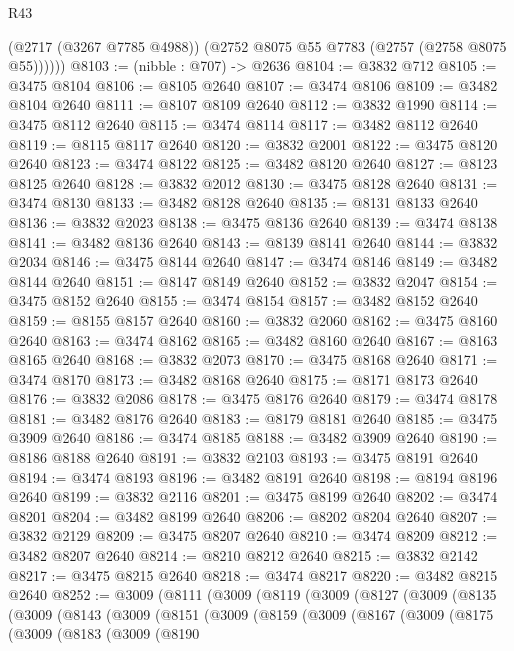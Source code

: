 \begin{lexlean}{R43}
\begin{coremodule}
          (@2717 (@3267 @7785 @4988))
          (@2752 @8075 @55 @7783 (@2757 (@2758 @8075 @55))))))
@8103 := (nibble : @707) -> @2636
@8104 := @3832 @712
@8105 := @3475 @8104
@8106 := @8105 @2640
@8107 := @3474 @8106
@8109 := @3482 @8104 @2640
@8111 := @8107 @8109 @2640
@8112 := @3832 @1990
@8114 := @3475 @8112 @2640
@8115 := @3474 @8114
@8117 := @3482 @8112 @2640
@8119 := @8115 @8117 @2640
@8120 := @3832 @2001
@8122 := @3475 @8120 @2640
@8123 := @3474 @8122
@8125 := @3482 @8120 @2640
@8127 := @8123 @8125 @2640
@8128 := @3832 @2012
@8130 := @3475 @8128 @2640
@8131 := @3474 @8130
@8133 := @3482 @8128 @2640
@8135 := @8131 @8133 @2640
@8136 := @3832 @2023
@8138 := @3475 @8136 @2640
@8139 := @3474 @8138
@8141 := @3482 @8136 @2640
@8143 := @8139 @8141 @2640
@8144 := @3832 @2034
@8146 := @3475 @8144 @2640
@8147 := @3474 @8146
@8149 := @3482 @8144 @2640
@8151 := @8147 @8149 @2640
@8152 := @3832 @2047
@8154 := @3475 @8152 @2640
@8155 := @3474 @8154
@8157 := @3482 @8152 @2640
@8159 := @8155 @8157 @2640
@8160 := @3832 @2060
@8162 := @3475 @8160 @2640
@8163 := @3474 @8162
@8165 := @3482 @8160 @2640
@8167 := @8163 @8165 @2640
@8168 := @3832 @2073
@8170 := @3475 @8168 @2640
@8171 := @3474 @8170
@8173 := @3482 @8168 @2640
@8175 := @8171 @8173 @2640
@8176 := @3832 @2086
@8178 := @3475 @8176 @2640
@8179 := @3474 @8178
@8181 := @3482 @8176 @2640
@8183 := @8179 @8181 @2640
@8185 := @3475 @3909 @2640
@8186 := @3474 @8185
@8188 := @3482 @3909 @2640
@8190 := @8186 @8188 @2640
@8191 := @3832 @2103
@8193 := @3475 @8191 @2640
@8194 := @3474 @8193
@8196 := @3482 @8191 @2640
@8198 := @8194 @8196 @2640
@8199 := @3832 @2116
@8201 := @3475 @8199 @2640
@8202 := @3474 @8201
@8204 := @3482 @8199 @2640
@8206 := @8202 @8204 @2640
@8207 := @3832 @2129
@8209 := @3475 @8207 @2640
@8210 := @3474 @8209
@8212 := @3482 @8207 @2640
@8214 := @8210 @8212 @2640
@8215 := @3832 @2142
@8217 := @3475 @8215 @2640
@8218 := @3474 @8217
@8220 := @3482 @8215 @2640
@8252 := @3009
    (@8111
      (@3009
        (@8119
          (@3009
            (@8127
              (@3009
                (@8135
                  (@3009
                    (@8143
                      (@3009
                        (@8151
                          (@3009
                            (@8159
                              (@3009
                                (@8167
                                  (@3009
                                    (@8175
                                      (@3009
                                        (@8183
                                          (@3009
                                            (@8190

\end{coremodule}
\end{lexlean}
